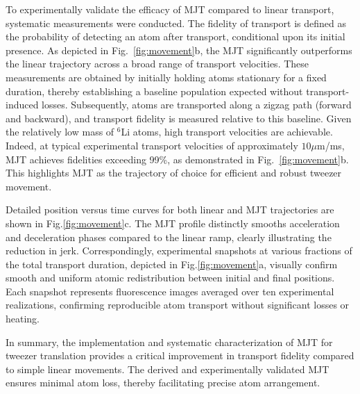 To experimentally validate the efficacy of MJT compared to linear transport, systematic measurements were conducted. The fidelity of transport is defined as the probability of detecting an atom after transport, conditional upon its initial presence. As depicted in Fig.~\ref{fig:movement}b, the MJT significantly outperforms the linear trajectory across a broad range of transport velocities. These measurements are obtained by initially holding atoms stationary for a fixed duration, thereby establishing a baseline population expected without transport-induced losses. Subsequently, atoms are transported along a zigzag path (forward and backward), and transport fidelity is measured relative to this baseline. Given the relatively low mass of $^6$Li atoms, high transport velocities are achievable. Indeed, at typical experimental transport velocities of approximately $10\mu$m/ms, MJT achieves fidelities exceeding 99\%, as demonstrated in Fig.~\ref{fig:movement}b. This highlights MJT as the trajectory of choice for efficient and robust tweezer movement.

Detailed position versus time curves for both linear and MJT trajectories are shown in Fig.\ref{fig:movement}c. The MJT profile distinctly smooths acceleration and deceleration phases compared to the linear ramp, clearly illustrating the reduction in jerk. Correspondingly, experimental snapshots at various fractions of the total transport duration, depicted in Fig.\ref{fig:movement}a, visually confirm smooth and uniform atomic redistribution between initial and final positions. Each snapshot represents fluorescence images averaged over ten experimental realizations, confirming reproducible atom transport without significant losses or heating.

In summary, the implementation and systematic characterization of MJT for tweezer translation provides a critical improvement in transport fidelity compared to simple linear movements. The derived and experimentally validated MJT ensures minimal atom loss, thereby facilitating precise atom arrangement. 

